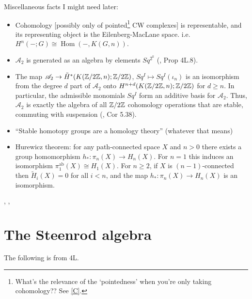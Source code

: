 \documentclass{MetricNotes2023}
\def\inte{\ensuremath\mathbb{Z}}
\DeclareMathOperator{\Hom}{Hom}
\begin{document}
Miscellaneous facts I might need later:
\begin{itemize}
\item Cohomology [possibly only of pointed\footnote{What's the relevance of the `pointedness' when you're only taking cohomology?? See \ref{C}.} CW complexes] is representable, and its representing object is the Eilenberg-MacLane space.  i.e. \(H^n(-; G)\cong \Hom(-, K(G, n))\). 
\item \(\mathscr A_2\) is generated as an algebra by elements \(Sq^{2^k}\) (\autocite{hatcher}, Prop 4L.8).
\item The map \(\mathscr A_2 \to \tilde H^*(K(\inte/2\inte, n); \inte/2\inte)\), \(Sq^I\mapsto Sq^I(\iota_n)\) is an isomorphism from the degree \(d\) part of \(\mathscr A_2\) onto \(H^{n+d}(K(\inte/2\inte, n); \inte/2\inte)\) for \(d \geq n\). In particular, the admissible monomials \(Sq^I\) form an additive basis for \(\mathscr A_2\). Thus, \(\mathscr A_2\) is exactly the algebra of all \(\inte/2\inte\) cohomology operations that are stable, commuting with suspension (\autocite{hatcher5}, Cor 5.38). 
\item ``Stable homotopy groups are a homology theory'' (whatever that means)
\item Hurewicz theorem: for any path-connected space \(X\) and \(n>0\) there exists a group homomorphism \(h_* : \pi_n(X)\to H_n(X)\). For \(n=1\) this induces an isomorphism \(\pi_1^{\text{ab}}(X)\cong H_1(X)\). For \(n \geq 2\), if \(X\) is \((n-1)\)-connected then \(\tilde H_i(X)=0\) for all \(i<n\), and the map \(h_* : \pi_n(X)\to H_n(X)\) is an isomorphism. 
\end{itemize}

\autocite{ass}, \autocite{suspension}, \autocite{hatcher}

\section{The Steenrod algebra}

The following is from \autocite{hatcher} 4L.
\end{document}
